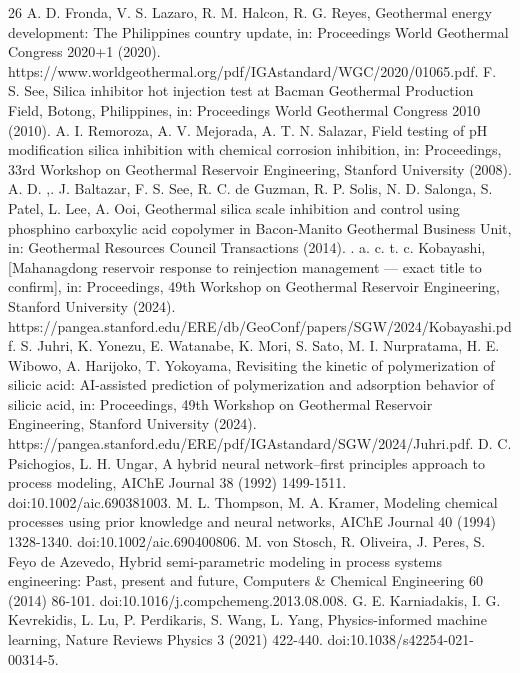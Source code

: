 \documentclass[review,number,sort&compress]{elsarticle}
\begin{document}
\begin{thebibliography}{26}
 A. D. Fronda, V. S. Lazaro, R. M. Halcon, R. G. Reyes, Geothermal energy development: The {Philippines} country update, in: Proceedings World Geothermal Congress 2020+1 (2020). https://www.worldgeothermal.org/pdf/IGAstandard/WGC/2020/01065.pdf.
 F. S. See, Silica inhibitor hot injection test at {Bacman} Geothermal Production Field, {Botong}, {Philippines, in: Proceedings World Geothermal Congress 2010 (2010).
 A. I. Remoroza, A. V. Mejorada, A. T. N. Salazar, Field testing of {pH} modification silica inhibition with chemical corrosion inhibition, in: Proceedings, 33rd Workshop on Geothermal Reservoir Engineering, Stanford University (2008).
 A. D. ,. J. Baltazar, F. S. See, R. C. de Guzman, R. P. Solis, N. D. Salonga, S. Patel, L. Lee, A. Ooi, Geothermal silica scale inhibition and control using phosphino carboxylic acid copolymer in {Bacon-Manito} Geothermal Business Unit, in: Geothermal Resources Council Transactions (2014).
 {. a. c. t. c. Kobayashi, [Mahanagdong reservoir response to reinjection management — exact title to confirm], in: Proceedings, 49th Workshop on Geothermal Reservoir Engineering, Stanford University (2024). https://pangea.stanford.edu/ERE/db/GeoConf/papers/SGW/2024/Kobayashi.pdf.
 S. Juhri, K. Yonezu, E. Watanabe, K. Mori, S. Sato, M. I. Nurpratama, H. E. Wibowo, A. Harijoko, T. Yokoyama, Revisiting the kinetic of polymerization of silicic acid: {AI}-assisted prediction of polymerization and adsorption behavior of silicic acid, in: Proceedings, 49th Workshop on Geothermal Reservoir Engineering, Stanford University (2024). https://pangea.stanford.edu/ERE/pdf/IGAstandard/SGW/2024/Juhri.pdf.
 D. C. Psichogios, L. H. Ungar, A hybrid neural network--first principles approach to process modeling, AIChE Journal 38 (1992) 1499-1511. doi:10.1002/aic.690381003.
 M. L. Thompson, M. A. Kramer, Modeling chemical processes using prior knowledge and neural networks, AIChE Journal 40 (1994) 1328-1340. doi:10.1002/aic.690400806.
 M. von Stosch, R. Oliveira, J. Peres, S. Feyo de Azevedo, Hybrid semi-parametric modeling in process systems engineering: Past, present and future, Computers \& Chemical Engineering 60 (2014) 86-101. doi:10.1016/j.compchemeng.2013.08.008.
 G. E. Karniadakis, I. G. Kevrekidis, L. Lu, P. Perdikaris, S. Wang, L. Yang, Physics-informed machine learning, Nature Reviews Physics 3 (2021) 422-440. doi:10.1038/s42254-021-00314-5.
}}
\end{thebibliography}
\end{document}

